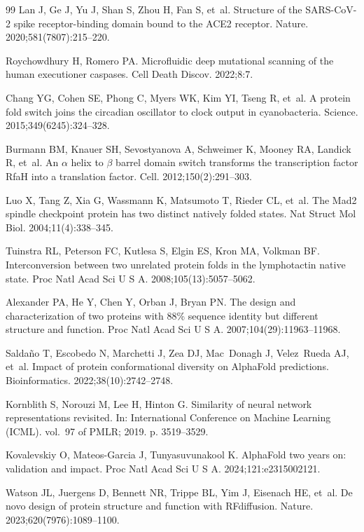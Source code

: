 \documentclass[10pt,a4paper]{article}
\begin{document}
\begin{thebibliography}{99}
Lan J, Ge J, Yu J, Shan S, Zhou H, Fan S, et~al.
\newblock Structure of the SARS-CoV-2 spike receptor-binding domain bound to the ACE2 receptor.
\newblock Nature. 2020;581(7807):215--220.

Roychowdhury H, Romero PA.
\newblock Microfluidic deep mutational scanning of the human executioner caspases.
\newblock Cell Death Discov. 2022;8:7.

Chang YG, Cohen SE, Phong C, Myers WK, Kim YI, Tseng R, et~al.
\newblock A protein fold switch joins the circadian oscillator to clock output in cyanobacteria.
\newblock Science. 2015;349(6245):324--328.

Burmann BM, Knauer SH, Sevostyanova A, Schweimer K, Mooney RA, Landick R, et~al.
\newblock An $\alpha$ helix to $\beta$ barrel domain switch transforms the transcription factor RfaH into a translation factor.
\newblock Cell. 2012;150(2):291--303.

Luo X, Tang Z, Xia G, Wassmann K, Matsumoto T, Rieder CL, et~al.
\newblock The Mad2 spindle checkpoint protein has two distinct natively folded states.
\newblock Nat Struct Mol Biol. 2004;11(4):338--345.

Tuinstra RL, Peterson FC, Kutlesa S, Elgin ES, Kron MA, Volkman BF.
\newblock Interconversion between two unrelated protein folds in the lymphotactin native state.
\newblock Proc Natl Acad Sci U S A. 2008;105(13):5057--5062.

Alexander PA, He Y, Chen Y, Orban J, Bryan PN.
\newblock The design and characterization of two proteins with 88\% sequence identity but different structure and function.
\newblock Proc Natl Acad Sci U S A. 2007;104(29):11963--11968.

Salda{\~n}o T, Escobedo N, Marchetti J, Zea DJ, Mac~Donagh J, Velez~Rueda AJ, et~al.
\newblock Impact of protein conformational diversity on AlphaFold predictions.
\newblock Bioinformatics. 2022;38(10):2742--2748.

Kornblith S, Norouzi M, Lee H, Hinton G.
\newblock Similarity of neural network representations revisited.
\newblock In: International Conference on Machine Learning (ICML). vol.~97 of PMLR; 2019. p. 3519--3529.

Kovalevskiy O, Mateos-Garcia J, Tunyasuvunakool K.
\newblock AlphaFold two years on: validation and impact.
\newblock Proc Natl Acad Sci U S A. 2024;121:e2315002121.

Watson JL, Juergens D, Bennett NR, Trippe BL, Yim J, Eisenach HE, et~al.
\newblock De novo design of protein structure and function with RFdiffusion.
\newblock Nature. 2023;620(7976):1089--1100.

\end{thebibliography}
\end{document}
